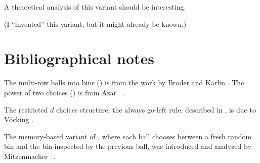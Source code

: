 A theoretical analysis of this variant should be interesting.

(I ``invented'' this variant, but it might already be known.)



\section{Bibliographical notes}

The multi-row balls into bins () is from the
work by Broder and Karlin \cite{bk-mah-90}. The power of two choices
() is from Azar \etal~\cite{abku-ba-90}.

The restricted $d$ choices structure, the always go-left rule, described
in , is due to V{\"{o}}ck{}i{n}g
\cite{v-hshlb-03}.

The memory-based variant of , where each ball chooses
between a fresh random bin and the bin inspected by the previous ball,
was introduced and analyzed by Mitzenmacher \etal~\cite{mps-bbm-02}.



%

\ChapterEnd{}

